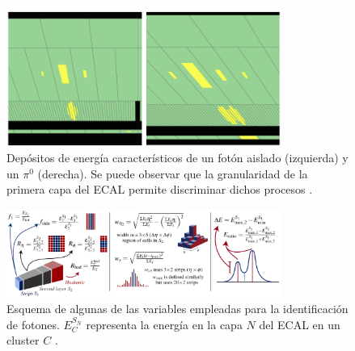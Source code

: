 \begin{figure}
  \centering
  \includegraphics[width=0.8\textwidth]{images/objects/PhotonPizero.png}
  \caption{Depósitos de energía característicos de un fotón aislado (izquierda) y un $\pi^0$ (derecha). Se puede observar que la granularidad de la primera capa del ECAL permite discriminar dichos procesos \cite{Wingerter-Seez:2315747}.}
  \label{fig:phpizero}
\end{figure}

\begin{figure}
  \centering
  \includegraphics[width=0.8\textwidth]{images/objects/shower_shapes.png}
  \caption{Esquema de algunas de las variables empleadas para la identificación de fotones. $E_C^{S_N}$ representa la energía en la capa $N$ del ECAL en un cluster $C$ \cite{PERF-2017-02}.}
  \label{fig:shower_shapes}
\end{figure}


